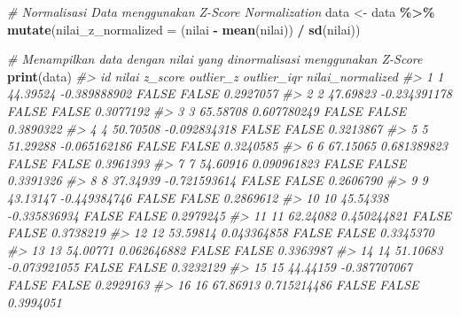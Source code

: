 \documentclass[
  oneside]{book}
\newenvironment{Shaded}{\begin{snugshade}}{\end{snugshade}}
\newcommand{\AttributeTok}[1]{\textcolor[rgb]{0.13,0.29,0.53}{#1}}
\newcommand{\CommentTok}[1]{\textcolor[rgb]{0.56,0.35,0.01}{\textit{#1}}}
\newcommand{\FunctionTok}[1]{\textcolor[rgb]{0.13,0.29,0.53}{\textbf{#1}}}
\newcommand{\NormalTok}[1]{#1}
\newcommand{\OtherTok}[1]{\textcolor[rgb]{0.56,0.35,0.01}{#1}}
\newcommand{\SpecialCharTok}[1]{\textcolor[rgb]{0.81,0.36,0.00}{\textbf{#1}}}
\begin{document}
\begin{Shaded}
\begin{Highlighting}[]
\CommentTok{\# Normalisasi Data menggunakan Z{-}Score Normalization}
\NormalTok{data }\OtherTok{\textless{}{-}}\NormalTok{ data }\SpecialCharTok{\%\textgreater{}\%}
  \FunctionTok{mutate}\NormalTok{(}\AttributeTok{nilai\_z\_normalized =}\NormalTok{ (nilai }\SpecialCharTok{{-}} \FunctionTok{mean}\NormalTok{(nilai)) }\SpecialCharTok{/} \FunctionTok{sd}\NormalTok{(nilai))}
\end{Highlighting}
\end{Shaded}

\begin{Shaded}
\begin{Highlighting}[]
\CommentTok{\# Menampilkan data dengan nilai yang dinormalisasi menggunakan Z{-}Score}
\FunctionTok{print}\NormalTok{(data)}
\CommentTok{\#\textgreater{}      id     nilai      z\_score outlier\_z outlier\_iqr nilai\_normalized}
\CommentTok{\#\textgreater{} 1     1  44.39524 {-}0.389888902     FALSE       FALSE        0.2927057}
\CommentTok{\#\textgreater{} 2     2  47.69823 {-}0.234391178     FALSE       FALSE        0.3077192}
\CommentTok{\#\textgreater{} 3     3  65.58708  0.607780249     FALSE       FALSE        0.3890322}
\CommentTok{\#\textgreater{} 4     4  50.70508 {-}0.092834318     FALSE       FALSE        0.3213867}
\CommentTok{\#\textgreater{} 5     5  51.29288 {-}0.065162186     FALSE       FALSE        0.3240585}
\CommentTok{\#\textgreater{} 6     6  67.15065  0.681389823     FALSE       FALSE        0.3961393}
\CommentTok{\#\textgreater{} 7     7  54.60916  0.090961823     FALSE       FALSE        0.3391326}
\CommentTok{\#\textgreater{} 8     8  37.34939 {-}0.721593614     FALSE       FALSE        0.2606790}
\CommentTok{\#\textgreater{} 9     9  43.13147 {-}0.449384746     FALSE       FALSE        0.2869612}
\CommentTok{\#\textgreater{} 10   10  45.54338 {-}0.335836934     FALSE       FALSE        0.2979245}
\CommentTok{\#\textgreater{} 11   11  62.24082  0.450244821     FALSE       FALSE        0.3738219}
\CommentTok{\#\textgreater{} 12   12  53.59814  0.043364858     FALSE       FALSE        0.3345370}
\CommentTok{\#\textgreater{} 13   13  54.00771  0.062646882     FALSE       FALSE        0.3363987}
\CommentTok{\#\textgreater{} 14   14  51.10683 {-}0.073921055     FALSE       FALSE        0.3232129}
\CommentTok{\#\textgreater{} 15   15  44.44159 {-}0.387707067     FALSE       FALSE        0.2929163}
\CommentTok{\#\textgreater{} 16   16  67.86913  0.715214486     FALSE       FALSE        0.3994051}

\end{Highlighting}
\end{Shaded}
\end{document}
